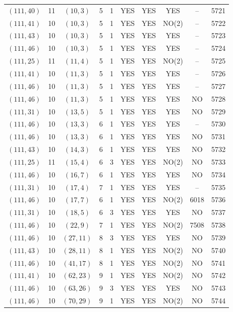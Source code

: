 \begin{longtable}{|c|c|c|c|c|c|c|c|c|c|}
$(111, 40)$ & 11 & $(10, 3)$ & 5 & 1 & YES & YES & YES & -- & 5721\\
$(111, 41)$ & 10 & $(10, 3)$ & 5 & 1 & YES & YES & NO(2) & -- & 5722\\
$(111, 43)$ & 10 & $(10, 3)$ & 5 & 1 & YES & YES & YES & -- & 5723\\
$(111, 46)$ & 10 & $(10, 3)$ & 5 & 1 & YES & YES & YES & -- & 5724\\
$(111, 25)$ & 11 & $(11, 4)$ & 5 & 1 & YES & YES & NO(2) & -- & 5725\\
$(111, 41)$ & 10 & $(11, 3)$ & 5 & 1 & YES & YES & YES & -- & 5726\\
$(111, 46)$ & 10 & $(11, 3)$ & 5 & 1 & YES & YES & YES & -- & 5727\\
$(111, 46)$ & 10 & $(11, 3)$ & 5 & 1 & YES & YES & YES & NO & 5728\\
$(111, 31)$ & 10 & $(13, 5)$ & 5 & 1 & YES & YES & YES & NO & 5729\\
$(111, 46)$ & 10 & $(13, 3)$ & 6 & 1 & YES & YES & YES & -- & 5730\\
$(111, 46)$ & 10 & $(13, 3)$ & 6 & 1 & YES & YES & YES & NO & 5731\\
$(111, 43)$ & 10 & $(14, 3)$ & 6 & 1 & YES & YES & YES & NO & 5732\\
$(111, 25)$ & 11 & $(15, 4)$ & 6 & 3 & YES & YES & NO(2) & NO & 5733\\
$(111, 46)$ & 10 & $(16, 7)$ & 6 & 1 & YES & YES & YES & NO & 5734\\
$(111, 31)$ & 10 & $(17, 4)$ & 7 & 1 & YES & YES & YES & -- & 5735\\
$(111, 46)$ & 10 & $(17, 7)$ & 6 & 1 & YES & YES & NO(2) & 6018 & 5736\\
$(111, 31)$ & 10 & $(18, 5)$ & 6 & 3 & YES & YES & YES & NO & 5737\\
$(111, 46)$ & 10 & $(22, 9)$ & 7 & 1 & YES & YES & NO(2) & 7508 & 5738\\
$(111, 46)$ & 10 & $(27, 11)$ & 8 & 3 & YES & YES & YES & NO & 5739\\
$(111, 43)$ & 10 & $(28, 11)$ & 8 & 1 & YES & YES & NO(2) & NO & 5740\\
$(111, 46)$ & 10 & $(41, 17)$ & 8 & 1 & YES & YES & NO(2) & NO & 5741\\
$(111, 41)$ & 10 & $(62, 23)$ & 9 & 1 & YES & YES & NO(2) & NO & 5742\\
$(111, 46)$ & 10 & $(63, 26)$ & 9 & 3 & YES & YES & YES & NO & 5743\\
$(111, 46)$ & 10 & $(70, 29)$ & 9 & 1 & YES & YES & NO(2) & NO & 5744\\

\end{longtable}
